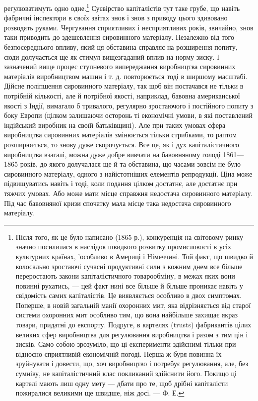 регулюватимуть одно одне.\footnote{
Після того, як це було написано (1865 р.), конкуренція на світовому ринку
значно посилилася в наслідок швидкого розвитку промисловості в усіх культурних
країнах, 'особливо в Америці і Німеччині. Той факт, що швидко й колосально
зростаючі сучасні продуктивні сили з кожним днем все більше переростають
закони капіталістичного товарообміну, в межах яких вони повинні
рухатись, — цей факт нині все більше й більше проникає навіть у свідомість
самих капіталістів. Це виявляється особливо в двох симптомах. Поперше, в новій
загальній манії охоронних мит, яка відрізняється від старої системи охоронних
мит особливо тим, що вона найбільше захищає якраз товари, придатні до
експорту. Подруге, в картелях (trusts) фабрикантів цілих великих сфер виробництва
для регулювання виробництва і разом з тим цін і зисків. Само собою
зрозуміло, що ці експерименти здійснимі тільки при відносно сприятливій
економічній погоді. Перша ж буря повинна їх зруйнувати і довести, що, хоч
виробництво і потребує регулювання, але, без сумніву, не капіталістичний клас
покликаний здійснити його. Покищо ці картелі мають лиш одну мету —
дбати про те, щоб дрібні капіталісти пожиралися великими ще швидше, ніж
досі. — Ф. Е.
} Суєвірство капіталістів тут таке
грубе, що навіть фабричні інспектори в своїх звітах знов і знов
з приводу цього здивовано розводять руками. Чергування сприятливих
і несприятливих років, звичайно, знов таки приводить до
здешевлення сировинного матеріалу. Незалежно від того безпосереднього
впливу, який ця обставина справляє на розширення
попиту, сюди долучається ще як стимул вищезгаданий
вплив на норму зиску. І зазначений вище процес ступневого
випереджання виробництва сировинних матеріалів виробництвом
машин і т. д. повторюється тоді в ширшому масштабі. Дійсне
поліпшення сировинного матеріалу, так щоб він постачався не
тільки в потрібній кількості, але й потрібної якості, наприклад,
бавовна американської якості з Індії, вимагало б тривалого, регулярно
зростаючого і постійного попиту з боку Европи (цілком
залишаючи осторонь ті економічні умови, в які поставлений індійський
виробник на своїй батьківщині). Але при таких умовах
сфера виробництва сировинних матеріалів змінюється тільки
стрибками, то раптом розширюється, то знову дуже скорочується.
Все це, як і дух капіталістичного виробництва взагалі, можна
дуже добре вивчати на бавовняному голоді 1861—1865 років, до
якого долучалася ще й та обставина, що часами зовсім не було
сировинного матеріалу, одного з найістотніших елементів репродукції.
Ціна може підвищуватись навіть і тоді, коли подання
цілком достатнє, але достатнє при тяжчих умовах. Або може
мати місце справжня недостача сировинного матеріалу. Під час
бавовняної кризи спочатку мала місце така недостача сировинного
матеріалу.


